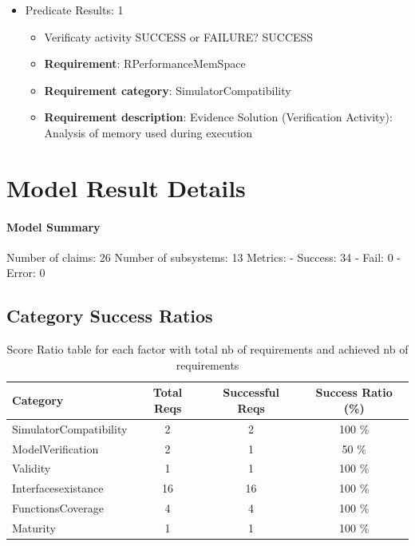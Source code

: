 \documentclass{article}
\begin{document}
\begin{itemize}
									    
				\item Predicate Results: 1
					\begin{itemize}				
					\item Verificaty activity SUCCESS or FAILURE? SUCCESS
					
					\item \textbf{Requirement}: RPerformanceMemSpace 
					\item \textbf{Requirement category}: SimulatorCompatibility
					\item \textbf{Requirement description}: Evidence Solution (Verification Activity): Analysis of memory used during execution
					\end{itemize}

			\end{itemize}

			\section{Model Result Details} 
			\paragraph{Model Summary}
			Number of claims: 26
			Number of subsystems: 13
			Metrics:
			- Success: 34
			- Fail: 0
			- Error: 0
			
	

					\subsection{Category Success Ratios}
						
						\begin{table}
						\centering
						\caption{Score Ratio table for each factor with total nb of requirements and achieved nb of requirements}
						\begin{tabular}{|l|c|c|c|}
						\hline
						Category & Total Reqs & Successful Reqs & Success Ratio (\%) \\
						\hline

							    SimulatorCompatibility & 2 & 2 & 100 \% \\
							 

							    ModelVerification & 2 & 1 & 50 \% \\
							 

							    Validity & 1 & 1 & 100 \% \\
							 

							    Interfacesexistance & 16 & 16 & 100 \% \\
							 

							    FunctionsCoverage & 4 & 4 & 100 \% \\
							 

							    Maturity & 1 & 1 & 100 \% \\
							 
					
						
						\hline
						\end{tabular}
						\end{table}
\end{document}
